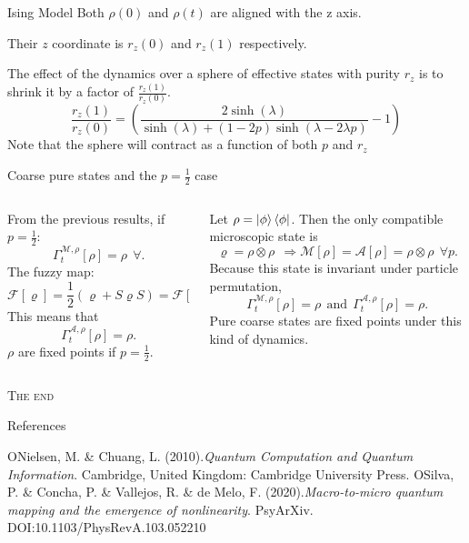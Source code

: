 \documentclass{cubeamer}
\newcommand{\mcF}{\mathcal{F}}
\newcommand{\mcM}{\mathcal{M}}
\newcommand{\mcA}{\mathcal{A}}
\begin{document}
\begin{frame}{Ising Model}
Both $\rho(0)$ and $\rho(t)$ are aligned with the z axis.

Their $z$ coordinate is $r_{z}(0)$ and $r_{z}(1)$ respectively. 

The effect of the dynamics over a sphere of effective states with purity $r_z$ is to shrink it by a factor of $\frac{r_{z}(1)}{r_{z}(0)}$.
        \begin{equation*}
            \frac{r_{z}(1)}{r_{z}(0)}=\left(\frac{2 \sinh (\lambda )}{\sinh (\lambda )+(1-2 p) \sinh (\lambda -2 \lambda  p)}-1\right)
        \end{equation*}
        Note that the sphere will contract as a function of both $p$ and $r_{z}$
\end{frame}
\begin{frame}{Coarse pure states and the $p=\frac{1}{2}$ case}
    \begin{columns}
        \begin{column}{0.5\textwidth}
    From the previous results, if $p=\frac{1}{2}$:
    \begin{equation*}
        \Gamma_{t}^{\mcM,\rho}[\rho]=\rho \ \ \forall.
    \end{equation*}
The fuzzy map:
\begin{equation*}
    \mcF[\varrho]=\frac{1}{2}(\varrho+S\varrho S)=\mcF[S\varrho S] \ \ \forall \varrho.
\end{equation*}
This means that
\begin{equation*}
    \Gamma_{t}^{\mcA,\rho}[\rho]=\rho.
\end{equation*}
$\rho$ are fixed points if $p=\frac{1}{2}$.
        \end{column}
    \begin{column}{0.5\textwidth}
Let $\rho=\ket{\phi}\bra{\phi}$. Then the only compatible microscopic state is
$$\varrho=\rho\otimes\rho \ \ \Rightarrow \mcM[\rho]=\mcA[\rho]=\rho\otimes\rho  \ \ \forall p.$$
Because this state is invariant under particle permutation,
\begin{equation*}
    \Gamma_{t}^{\mcM,\rho}[\rho]=\rho \ \ \text{and} \ \ \Gamma_{t}^{\mcA,\rho}[\rho]=\rho.
\end{equation*}
Pure coarse states are fixed points under this kind of dynamics.
        \end{column}
    \end{columns}
\end{frame}

\begin{frame}[standout]
    \Huge\textsc{The end}
    
    \vfill
\end{frame}
\appendix

\begin{frame}{References}
\begin{thebibliography}{99}
\bibitem ONielsen, M. \& Chuang, L. (2010).\textit{Quantum Computation and Quantum Information}. Cambridge, United Kingdom: Cambridge University Press.
\bibitem OSilva, P. \& Concha, P. \& Vallejos, R. \& de Melo, F. (2020).\textit{Macro-to-micro quantum mapping and the emergence of nonlinearity}. PsyArXiv. DOI:10.1103/PhysRevA.103.052210
\end{thebibliography}
\end{frame}
\end{document}
